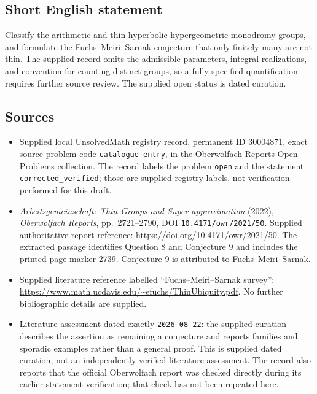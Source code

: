 \documentclass[11pt]{article}
\begin{document}
\subsection{Short English statement}
Classify the arithmetic and thin hyperbolic hypergeometric monodromy groups, and formulate the Fuchs--Meiri--Sarnak conjecture that only finitely many are not thin. The supplied record omits the admissible parameters, integral realizations, and convention for counting distinct groups, so a fully specified quantification requires further source review. The supplied open status is dated curation.
\subsection{Sources}
\begin{itemize}
\item Supplied local UnsolvedMath registry record, permanent ID \(30004871\), exact source problem code \texttt{catalogue entry}, in the Oberwolfach Reports Open Problems collection. The record labels the problem \texttt{open} and the statement \texttt{corrected\_verified}; those are supplied registry labels, not verification performed for this draft.
\item \emph{Arbeitsgemeinschaft: Thin Groups and Super-approximation} (2022), \emph{Oberwolfach Reports}, pp.\ 2721--2790, DOI \texttt{10.4171/owr/2021/50}. Supplied authoritative report reference: \url{https://doi.org/10.4171/owr/2021/50}. The extracted passage identifies Question 8 and Conjecture 9 and includes the printed page marker 2739. Conjecture 9 is attributed to Fuchs--Meiri--Sarnak.
\item Supplied literature reference labelled ``Fuchs--Meiri--Sarnak survey'': \url{https://www.math.ucdavis.edu/~efuchs/ThinUbiquity.pdf}. No further bibliographic details are supplied.
\item Literature assessment dated exactly \texttt{2026-08-22}: the supplied curation describes the assertion as remaining a conjecture and reports families and sporadic examples rather than a general proof. This is supplied dated curation, not an independently verified literature assessment. The record also reports that the official Oberwolfach report was checked directly during its earlier statement verification; that check has not been repeated here.
\end{itemize}
\end{document}

